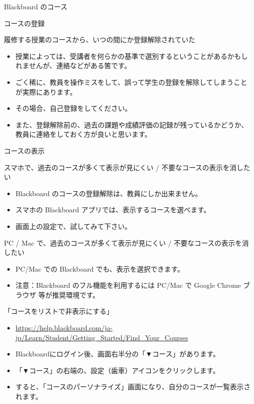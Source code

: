\documentclass[a4j,10pt]{jsarticle}
\begin{document}
{\begin{frame}[label={sec:orgda0915a},fragile]{Blackboard のコース}
\begin{block}{コースの登録}
\begin{block}{履修する授業のコースから、いつの間にか登録解除されていた}
\begin{itemize}
\item 授業によっては、受講者を何らかの基準で選別するということがあるかもしれませんが、連絡などがある筈です。
\item ごく稀に、教員を操作ミスをして、誤って学生の登録を解除してしまうことが実際にあります。
\item その場合、自己登録をしてください。
\item また、登録解除前の、過去の課題や成績評価の記録が残っているかどうか、教員に連絡をしておく方が良いと思います。
\end{itemize}
\end{block}
\end{block}
\par
\begin{block}{コースの表示}
\begin{block}{スマホで、過去のコースが多くて表示が見にくい / 不要なコースの表示を消したい}
\begin{itemize}
\item Blackboard のコースの登録解除は、教員にしか出来ません。
\item スマホの Blackboard アプリでは、表示するコースを選べます。
\item 画面上の設定で、試してみて下さい。
\end{itemize}
\end{block}
\par
\begin{block}{PC / Mac で、過去のコースが多くて表示が見にくい / 不要なコースの表示を消したい}
\begin{itemize}
\item PC/Mac での Blackboard でも、表示を選択できます。
\item 注意：Blackboard のフル機能を利用するには PC/Mac で Google Chrome ブラウザ 等が推奨環境です。
\end{itemize}
\par
\begin{block}{「コースをリストで非表示にする」}
\begin{itemize}
\item \url{https://help.blackboard.com/ja-jp/Learn/Student/Getting\_Started/Find\_Your\_Courses}
\par
\item Blackboardにログイン後、画面右半分の「▼コース」があります。
\item 「▼コース」の右端の、設定（歯車）アイコンをクリックします。
\item すると、「コースのパーソナライズ」画面になり、自分のコースが一覧表示されます。

\end{itemize}
\end{block}
\end{block}
\end{block}
\end{frame}}
\end{document}
